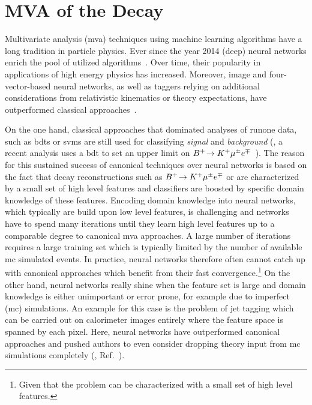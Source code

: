 \chapter{MVA of the Decay \texorpdfstring{\decay{\Lb}{\Dz\Lz}}{Λb → DΛ}}
\label{chap:mva}
Multivariate analysis (\gls{mva}) techniques using machine learning algorithms have a long tradition in particle physics.
Ever since the year 2014 (deep) neural networks enrich the pool of utilized algorithms~\cite{firsthepdnn}.
Over time, their popularity in applications of high energy physics has increased.
Moreover, image and four-vector-based neural networks, as well as taggers relying on additional considerations from relativistic kinematics or theory expectations, have outperformed classical approaches~\cite{motheroftaggers,toptaggerlandscape}.

On the one hand, classical approaches that dominated analyses of \gls{runone} data, such as \glspl{bdt} or \glspl{svm} are still used for classifying \textit{signal} and \textit{background} (\eg{}, a recent analysis uses a \gls{bdt} to set an upper limit on ${{B}^+}\!\rightarrow {\ensuremath{{K}^+}}{\ensuremath{\mu}}^\pm{\ensuremath{e}}^\mp$~\cite{BuToKmue}).
The reason for this sustained success of canonical techniques over neural networks is based on the fact that decay reconstructions such as ${{B}^+}\!\rightarrow {\ensuremath{{K}^+}}{\ensuremath{\mu}}^\pm{\ensuremath{e}}^\mp$ or \decay{\Lb}{\Dz\Lz} are characterized by a small set of high level features and classifiers are boosted by specific domain knowledge of these features.
Encoding domain knowledge into neural networks, which typically are build upon low level features, is challenging and networks have to spend many iterations until they learn high level features up to a comparable degree to canonical \gls{mva} approaches.
A large number of iterations requires a large training set which is typically limited by the number of available \gls{mc} simulated events.
In practice, neural networks therefore often cannot catch up with canonical approaches which benefit from their fast convergence.\footnote{Given that the problem can be characterized with a small set of high level features.}
On the other hand, neural networks really shine when the feature set is large and domain knowledge is either unimportant or error prone, for example due to imperfect (\gls{mc}) simulations.
An example for this case is the problem of jet tagging which can be carried out on calorimeter images entirely where the feature space is spanned by each pixel. 
Here, neural networks have outperformed canonical approaches and pushed authors to even consider dropping theory input from \gls{mc} simulations completely (\eg{}, Ref.~\cite{motheroftaggers}).


